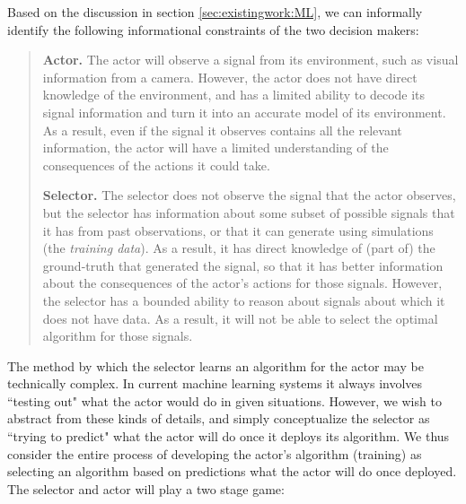 Based on the discussion in section \ref{sec:existingwork:ML}, we can informally identify the following informational constraints of the two decision makers:
\begin{quote}
	\textbf{Actor.} The actor will observe a signal from its environment, such as visual information from a camera. However, the actor does not have direct knowledge of the environment, and has a limited ability to decode its signal information and turn it into an accurate model of its environment. As a result, even if the signal it observes contains all the relevant information, the actor will have a limited understanding of the consequences of the actions it could take. 
	
	\textbf{Selector.} The selector does not observe the signal that the actor observes, but the selector has information about some subset of possible signals that it has from past observations, or that it can generate using simulations (the \textit{training data}). As a result, it has direct knowledge of (part of) the ground-truth that generated the signal, so that it has better information about the consequences of the actor's actions for those signals. However, the selector has a bounded ability to reason about signals about which it does not have data. As a result, it will not be able to select the optimal algorithm for those signals.   %
\end{quote}

The method by which the selector learns an algorithm for the actor may be technically complex. In current machine learning systems it always involves ``testing out" what the actor would do in given situations. However, we wish to abstract from these kinds of details, and simply conceptualize the selector as ``trying to predict" what the actor will do once it deploys its algorithm. We thus consider the entire process of developing the actor's algorithm (training) as selecting an algorithm based on predictions what the actor will do once deployed. The selector and actor will play a two stage game:

